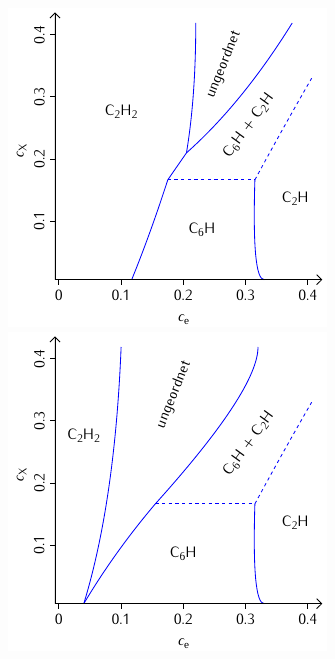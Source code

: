 \documentclass[a4paper, 10pt, twoside, openany]{book} %
\begin{document}
\begin{figure}
    \begin{minipage}[b]{0.48\textwidth}
        \includegraphics[width=\textwidth]{Abbildungen/Phasendiagramme/Schemata/H.pdf}
    \end{minipage}
    \hfill
    \begin{minipage}[b]{0.48\textwidth}
        \includegraphics[width=\textwidth]{Abbildungen/Phasendiagramme/Schemata/H_penalty.pdf}
    \end{minipage}


\end{figure}
\end{document}
